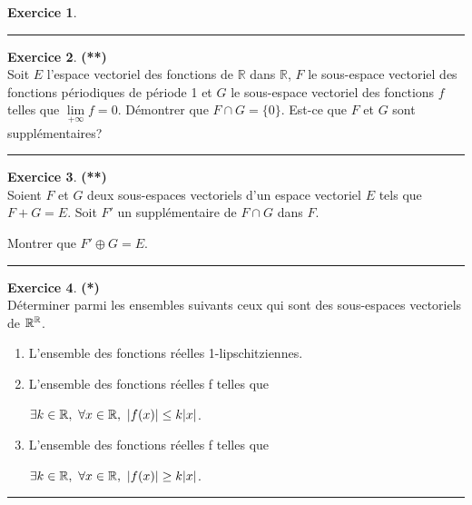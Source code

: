 \documentclass[a4paper,11pt]{article}
\theoremstyle{definition}
\newtheorem{exo}{Exercice} %
\begin{document}
\begin{minipage}{1\linewidth}
\begin{minipage}[t]{0.48\linewidth}
\begin{exo}
\centering\rule{1\linewidth}{0.6pt}\end{exo}
		

\begin{exo}\textbf{(**)}\quad\\[0.2cm]
Soit $E$ l'espace vectoriel des fonctions de $\mathbb R$ dans $\mathbb R$, $F$ le sous-espace vectoriel des fonctions périodiques de période 1 et $G$ le sous-espace vectoriel des fonctions $f$ telles que $\lim\limits_{+\infty}f=0$. Démontrer que $F\cap G=\{0\}$. Est-ce que $F$ et $G$ sont supplémentaires?

\centering\rule{1\linewidth}{0.6pt}\end{exo}


\begin{exo}\textbf{(**)}\quad\\[0.2cm]
Soient $F$ et $G$ deux sous-espaces vectoriels d'un espace vectoriel $E$ tels que
$F+G=E$. Soit $F'$ un supplémentaire de $F\cap G$ dans $F$. 

Montrer que $F'\oplus G=E$.

\centering\rule{1\linewidth}{0.6pt}\end{exo}
\end{minipage}\hfill\vrule\hfill\begin{minipage}[t]{0.48\linewidth}\raggedright
\begin{exo}\textbf{(*)}\quad\\[0.2cm]
Déterminer parmi les ensembles suivants ceux qui sont des sous-espaces vectoriels de $\mathbb{R}^{\mathbb{R}}$.
\begin{enumerate}
	\item L’ensemble des fonctions réelles 1-lipschitziennes.
	\item L’ensemble des fonctions réelles f telles que
	 
	\centering$\exists k \in \mathbb{R},\ \forall x \in\mathbb{R},\ | f (x )| \leq  k |x |$.
	
	\raggedright
	\item L’ensemble des fonctions réelles f telles que
	
	\centering$\exists k \in \mathbb{R},\ \forall x \in\mathbb{R},\ | f (x )| \geq  k |x |$.
	
	\raggedright
\end{enumerate}
\centering\rule{1\linewidth}{0.6pt}\end{exo}



\end{minipage}
\end{minipage}
\end{document}

